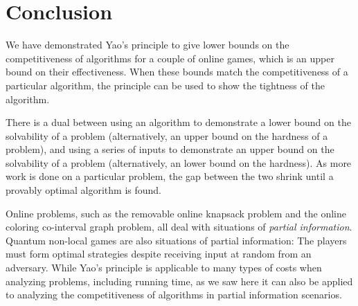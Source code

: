 \section{Conclusion}
We have demonstrated Yao's principle to give lower bounds on the competitiveness of algorithms for a couple of online games, which is an upper bound on their effectiveness. When these bounds match the competitiveness of a particular algorithm, the principle can be used to show the tightness of the algorithm.

There is a dual between using an algorithm to demonstrate a lower bound on the solvability of a problem (alternatively, an upper bound on the hardness of a problem), and using a series of inputs to demonstrate an upper bound on the solvability of a problem (alternatively, an lower bound on the hardness). As more work is done on a particular problem, the gap between the two shrink until a provably optimal algorithm is found.

Online problems, such as the removable online knapsack problem and the online coloring co-interval graph problem, all deal with situations of \emph{partial information}. Quantum non-local games are also situations of partial information: The players must form optimal strategies despite receiving input at random from an adversary. While Yao's principle is applicable to many types of costs when analyzing problems, including running time, as we saw here it can also be applied to analyzing the competitiveness of algorithms in partial information scenarios.
